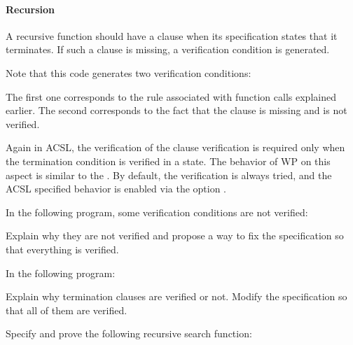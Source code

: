\paragraph{Recursion}


A recursive function should have a  clause when its
specification states that it terminates. If such a clause is missing, a
verification condition  is generated.




Note that this code generates two verification conditions:




The first one corresponds to the rule associated with function calls explained
earlier. The second corresponds to the fact that the 
clause is missing and is not verified.


Again in ACSL, the verification of the  clause
verification is required only when the termination condition is verified in
a  state. The behavior of WP on this aspect is similar to the
. By default, the verification is always tried, and the
ACSL specified behavior is enabled via the option
.








In the following program, some verification conditions are not verified:




Explain why they are not verified and propose a way to fix the specification so
that everything is verified.




In the following program:




Explain why termination clauses are verified or not. Modify the specification so
that all of them are verified.




Specify and prove the following recursive search function:




